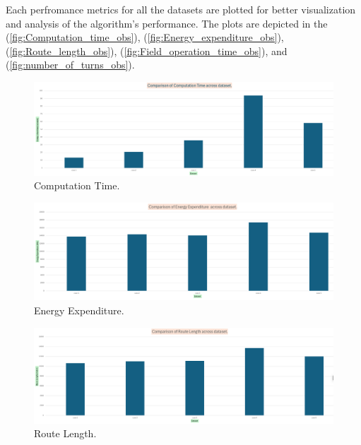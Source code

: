 


Each perfromance metrics for all the datasets are plotted for better visualization and analysis of the algorithm's performance. The plots are depicted in the (\autoref{fig:Computation_time_obs}), (\autoref{fig:Energy_expenditure_obs}), (\autoref{fig:Route_length_obs}), (\autoref{fig:Field_operation_time_obs}), and (\autoref{fig:number_of_turns_obs}).


\begin{figure}[H]
    \centering
    \includegraphics[width=\textwidth]{Images/plots/obs/computation_time.png}
    \caption{Computation Time.}
    \label{fig:Computation_time_obs}
\end{figure}

\begin{figure}[H]
    \centering
    \includegraphics[width=\textwidth]{Images/plots/obs/Energy.png}
    \caption{Energy Expenditure.}
    \label{fig:Energy_expenditure_obs}
\end{figure}

\begin{figure}[H]
    \centering
    \includegraphics[width=\textwidth]{Images/plots/obs/route_length.png}
    \caption{Route Length.}
    \label{fig:Route_length_obs}
\end{figure}

